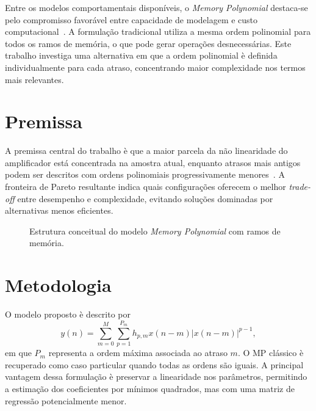\documentclass[sigconf]{acmart}
\begin{document}
Entre os modelos comportamentais dispon\'iveis, o \textit{Memory Polynomial} destaca-se pelo compromisso favor\'avel entre capacidade de modelagem e custo computacional~\cite{Kim2001,GonalvesdeLima2009,Cripps2006,Kenington2000,Kwan2012,Bonfim2016,John2016,Luiza2016,Chavez2018,Schuartz2017,Silva2013}. A formula\c{c}\~ao tradicional utiliza a mesma ordem polinomial para todos os ramos de mem\'oria, o que pode gerar opera\c{c}\~oes desnecess\'arias. Este trabalho investiga uma alternativa em que a ordem polinomial \`e definida individualmente para cada atraso, concentrando maior complexidade nos termos mais relevantes.

\section{Premissa}
A premissa central do trabalho \`e que a maior parcela da n\~ao linearidade do amplificador est\'a concentrada na amostra atual, enquanto atrasos mais antigos podem ser descritos com ordens polinomiais progressivamente menores~\cite{John2016,Schuartz2017}. A fronteira de Pareto resultante indica quais configura\c{c}\~oes oferecem o melhor \textit{trade-off} entre desempenho e complexidade, evitando solu\c{c}\~oes dominadas por alternativas menos eficientes.

\begin{figure}[t]
  \centering
  \caption{Estrutura conceitual do modelo \textit{Memory Polynomial} com ramos de mem\'oria.}
  \label{fig:mp-estrutura}
\end{figure}

\section{Metodologia}
O modelo proposto \`e descrito por
\begin{equation}
  y(n) = \sum_{m=0}^{M} \sum_{p=1}^{P_m} h_{p,m} x(n-m) |x(n-m)|^{p-1},
\end{equation}
em que $P_m$ representa a ordem m\'axima associada ao atraso $m$. O MP cl\'assico \`e recuperado como caso particular quando todas as ordens s\~ao iguais. A principal vantagem dessa formula\c{c}\~ao \`e preservar a linearidade nos par\^ametros, permitindo a estima\c{c}\~ao dos coeficientes por m\'inimos quadrados, mas com uma matriz de regress\~ao potencialmente menor.
\end{document}
